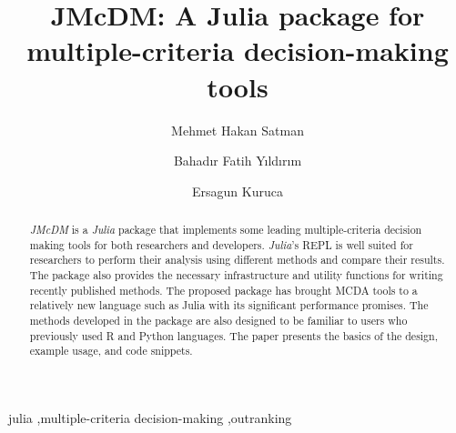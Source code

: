 \documentclass[preprint,review, 12pt, a4paper]{elsarticle}
\begin{document}
\begin{frontmatter}



\title{JMcDM: A Julia package for multiple-criteria decision-making tools}


\author[author1]{Mehmet Hakan Satman}
\author[author2]{Bahadır Fatih Yıldırım}
\author[author3]{Ersagun Kuruca}


\address[author1]{Istanbul University, Department of Econometrics, Beyazit, Istanbul, Turkey}
\address[author2]{Istanbul University, Department of Transportation and Logistics, Avcilar, Istanbul, Turkey}
\address[author3]{Istanbul Technical University, Department of Computer Engineering, Sariyer,  Istanbul, Turkey}





\begin{abstract}
\emph{JMcDM} is a \emph{Julia} package that implements some leading multiple-criteria decision making tools for both researchers and developers. \emph{Julia}'s REPL is well suited for researchers to perform their analysis using different methods and compare their results. The package also provides the necessary infrastructure and utility functions for writing recently published methods.  The proposed package has brought MCDA tools to a relatively new language such as Julia with its significant performance promises. The methods developed in the package are also designed to be familiar to users who previously used R and Python languages. The paper presents the basics of the design, example usage, and code snippets.

\end{abstract}

\begin{keyword}
julia  \sep multiple-criteria decision-making \sep outranking



\end{keyword}

\end{frontmatter}
\end{document}
